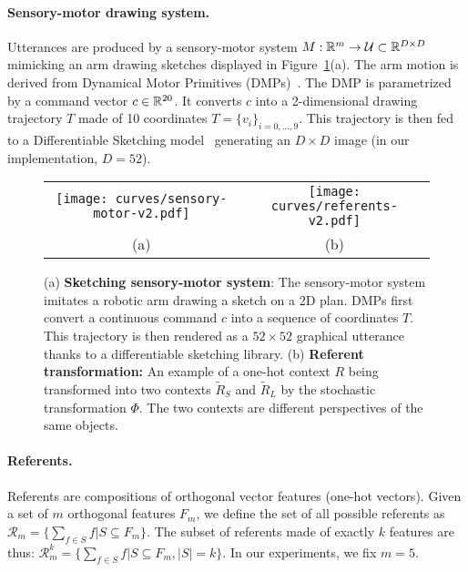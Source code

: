 \paragraph{Sensory-motor drawing system.} 
Utterances are produced by a sensory-motor system ${M: \mathbb{R}^m \rightarrow \mathcal{U} \subset \mathbb{R}^{D\times D}}$ mimicking an arm drawing sketches displayed in Figure~\ref{fig:prob_def}(a). The arm motion is derived from Dynamical Motor Primitives (DMPs)~\citep{schaal2006dynamic}. The DMP is parametrized by a command vector $c\in\mathbb{R}^{20}$. It converts $c$ into a 2-dimensional drawing trajectory $T$ made of 10 coordinates $T=\{v_i\}_{i=0,...,9}$. This trajectory is then fed to a Differentiable Sketching model~\citep{Mihai2021DifferentiableDA} generating an $D\times D$ image (in our implementation, $D=52$).

\begin{figure}[h!]
\centering 
\vspace{-0.3cm}
\begin{tabular}{cc}
\texttt{[image: curves/sensory-motor-v2.pdf]} &  \texttt{[image: curves/referents-v2.pdf]}\\
(a) & (b)
\end{tabular}
\vspace{-0.2cm}
\caption{(a) \textbf{Sketching sensory-motor system}: The sensory-motor system imitates a robotic arm drawing a sketch on a 2D plan. DMPs first convert a continuous command $c$ into a sequence of coordinates $T$. This trajectory is then rendered as a $52\times52$ graphical utterance thanks to a differentiable sketching library. (b) \textbf{Referent transformation:} An example of a one-hot context $R$ being transformed into two contexts $\tilde{R}_S$ and $\tilde{R}_L$ by the stochastic transformation $\Phi$. The two contexts are different perspectives of the same objects.}
\vspace{-0.1cm}
\label{fig:prob_def}
\end{figure}

\paragraph{Referents.}
Referents are compositions of orthogonal vector features (one-hot vectors). Given a set of $m$ orthogonal features $F_m$, we define the set of all possible referents as ${\mathcal{R}_m = \{ \textstyle\sum_{f \in S} f | S \subseteq F_m \}}$. The subset of referents made of exactly $k$ features are thus: ${\mathcal{R}^k_m=\{ \textstyle\sum_{f \in S} f | S \subseteq F_m, |S| = k\}}$. In our experiments, we fix $m=5$.

